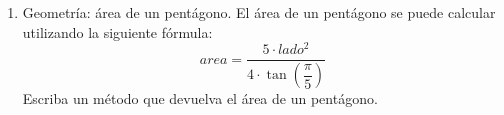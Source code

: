 
\begin{enumerate}

\item Geometría: área de un pentágono. El área de un pentágono se puede calcular utilizando la siguiente fórmula: 
    $$area = \dfrac{5\cdot lado^2}{4\cdot \tan\left(\dfrac{\pi}{5}\right)}$$
    Escriba un método que devuelva el área de un pentágono.\\\\


\end{enumerate}
